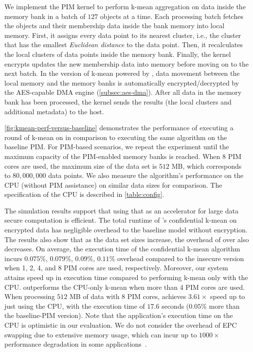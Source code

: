 We implement the PIM kernel to perform k-mean aggregation on data inside the memory bank in a batch of $127$ objects at a time. Each processing batch fetches the objects and their membership data inside the bank memory into local memory. First, it assigns every data point to its nearest cluster, i.e., the cluster that has the smallest \emph{Euclidean distance} to the data point. Then, it recalculates the local clusters of data points inside the memory bank. Finally, the kernel encrypts updates the new membership data into memory before moving on to the next batch. In the version of k-mean powered by \thename, data movement between the local memory and the memory banks is automatically encrypted/decrypted by the AES-capable DMA engine (\cref{subsec:aes-dma}). After all data in the memory bank has been processed, the kernel sends the results (the local clusters and additional metadata) to the host.





\autoref{fig:kmean-perf-versus-baseline} demonstrates the performance of executing a round of k-mean on \thename in comparison to executing the same algorithm on the baseline PIM. For PIM-based scenarios, we repeat the experiment until the maximum capacity of the PIM-enabled memory banks is reached. When 8 PIM cores are used, the maximum size of the data set is $512$ MB, which corresponds to $80,000,000$  data points. We also measure the algorithm's performance on the CPU (without PIM assistance) on similar data sizes for comparison. The specification of the CPU is described in \autoref{table:config}.

The simulation results support that using that \thename as an accelerator for large data secure computation is efficient. 
The total runtime of \thename's confidential k-mean on encrypted data has negligible overhead to the baseline model without encryption. The results also show that as the data set sizes increase, the overhead of \thename over \baseline also decreases. On average, the execution time of the confidential k-mean algorithm incurs $0.075$\%, $0.079$\%, $0.09$\%, $0.11$\% overhead compared to the insecure version when 1, 2, 4, and 8 PIM cores are used, respectively. Moreover, our system attains speed up in execution time compared to performing k-mean only with the CPU. \thename outperforms the CPU-only k-mean when more than 4 PIM cores are used. When processing $512$ MB of data with 8 PIM cores, \thename achieves $3.61 \times$ speed up to just using the CPU, with the execution time of $17.6$ seconds ($0.05$\% more than the baseline-PIM version). Note that the application's execution time on the CPU is optimistic in our evaluation. We do not consider the overhead of EPC swapping due to extensive memory usage, which can incur up to $1000\times$ performance degradation in some applications~\cite{zerotrace,scone}.


